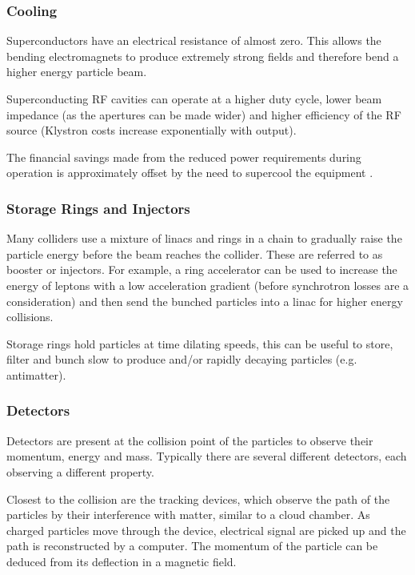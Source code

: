 \subsubsection{Cooling}
 
 Superconductors have an electrical resistance of almost zero. This allows the bending electromagnets to produce extremely strong fields and therefore bend a higher energy particle beam.
 
 Superconducting RF cavities can operate at a higher duty cycle, lower beam impedance (as the apertures can be made wider) and higher efficiency of the RF source (Klystron costs increase exponentially with output). 
 
 The financial savings made from the reduced power requirements during operation is approximately offset by the need to supercool the equipment \cite{ILC:ReferenceDesignReport}.
 
 \subsubsection{Storage Rings and Injectors}
 
Many colliders use a mixture of linacs and rings in a chain to gradually raise the particle energy before the beam reaches the collider. These are referred to as booster or injectors. For example, a ring accelerator can be used to increase the energy of leptons with a low acceleration gradient (before synchrotron losses are a consideration) and then send the bunched particles into a linac for higher energy collisions.

Storage rings hold particles at time dilating speeds, this can be useful to store, filter and bunch slow to produce and/or rapidly decaying particles (e.g. antimatter).

 \subsubsection{Detectors}
  
 Detectors are present at the collision point of the particles to observe their momentum, energy and mass. Typically there are several different detectors, each observing a different property. 
 
 Closest to the collision are the tracking devices, which observe the path of the particles by their interference with matter, similar to a cloud chamber. As charged particles move through the device, electrical signal are picked up and the path is reconstructed by a computer. The momentum of the particle can be deduced from its deflection in a magnetic field.
 
